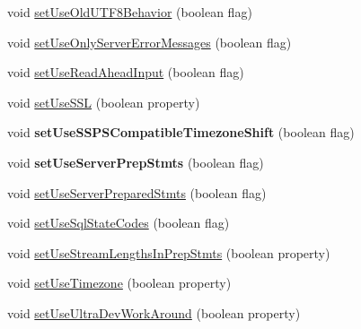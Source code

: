 \begin{DoxyCompactItemize}
\item 
void \mbox{\hyperlink{classcom_1_1mysql_1_1jdbc_1_1_multi_host_my_s_q_l_connection_abafab2c58d9f694f0b8d332f19d012f3}{set\+Use\+Old\+U\+T\+F8\+Behavior}} (boolean flag)
\item 
void \mbox{\hyperlink{classcom_1_1mysql_1_1jdbc_1_1_multi_host_my_s_q_l_connection_a64cd255943d0563c0246595083a5f2a7}{set\+Use\+Only\+Server\+Error\+Messages}} (boolean flag)
\item 
void \mbox{\hyperlink{classcom_1_1mysql_1_1jdbc_1_1_multi_host_my_s_q_l_connection_a21f5fe21bfa20f67e36444ccc130fa4a}{set\+Use\+Read\+Ahead\+Input}} (boolean flag)
\item 
void \mbox{\hyperlink{classcom_1_1mysql_1_1jdbc_1_1_multi_host_my_s_q_l_connection_ae199aca42e23e5ce684e148fb051da71}{set\+Use\+S\+SL}} (boolean property)
\item 
\mbox{\label{classcom_1_1mysql_1_1jdbc_1_1_multi_host_my_s_q_l_connection_a9e2a069caccc91f2c6788d0a7c0cb1c5}} 
void {\bfseries set\+Use\+S\+S\+P\+S\+Compatible\+Timezone\+Shift} (boolean flag)
\item 
\mbox{\label{classcom_1_1mysql_1_1jdbc_1_1_multi_host_my_s_q_l_connection_ae9c954a8002d8e6af7bea0a3f329c436}} 
void {\bfseries set\+Use\+Server\+Prep\+Stmts} (boolean flag)
\item 
void \mbox{\hyperlink{classcom_1_1mysql_1_1jdbc_1_1_multi_host_my_s_q_l_connection_a94135430993c4b5420c93a25e97f2012}{set\+Use\+Server\+Prepared\+Stmts}} (boolean flag)
\item 
void \mbox{\hyperlink{classcom_1_1mysql_1_1jdbc_1_1_multi_host_my_s_q_l_connection_a71f99bc9ca78dfeaa258b42946f7f2fd}{set\+Use\+Sql\+State\+Codes}} (boolean flag)
\item 
void \mbox{\hyperlink{classcom_1_1mysql_1_1jdbc_1_1_multi_host_my_s_q_l_connection_a29c813718362120ef1f0b6e6f0b7bb0a}{set\+Use\+Stream\+Lengths\+In\+Prep\+Stmts}} (boolean property)
\item 
void \mbox{\hyperlink{classcom_1_1mysql_1_1jdbc_1_1_multi_host_my_s_q_l_connection_a3854f7fb3b5d199edae3890e38bf9b7c}{set\+Use\+Timezone}} (boolean property)
\item 
void \mbox{\hyperlink{classcom_1_1mysql_1_1jdbc_1_1_multi_host_my_s_q_l_connection_a2280fcb76a916e625848333e80572871}{set\+Use\+Ultra\+Dev\+Work\+Around}} (boolean property)

\end{DoxyCompactItemize}
